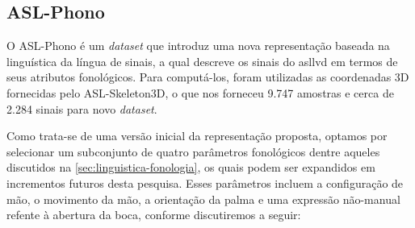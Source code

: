 \subsection{ASL-Phono}
\label{sec:metodologia-datasets-phono}

O ASL-Phono é um \textit{dataset} que introduz uma nova representação baseada na linguística da língua de sinais, a qual descreve os sinais do \acrshort{asllvd} em termos de seus atributos fonológicos. Para computá-los, foram utilizadas as coordenadas 3D fornecidas pelo ASL-Skeleton3D, o que nos forneceu 9.747 amostras e cerca de 2.284 sinais para novo \textit{dataset}.

Como trata-se de uma versão inicial da representação proposta, optamos por selecionar um subconjunto de quatro parâmetros fonológicos dentre aqueles discutidos na \autoref{sec:linguistica-fonologia}, os quais podem ser expandidos em incrementos futuros desta pesquisa. Esses parâmetros incluem a configuração de mão, o movimento da mão, a orientação da palma e uma expressão não-manual refente à abertura da boca, conforme discutiremos a seguir:

